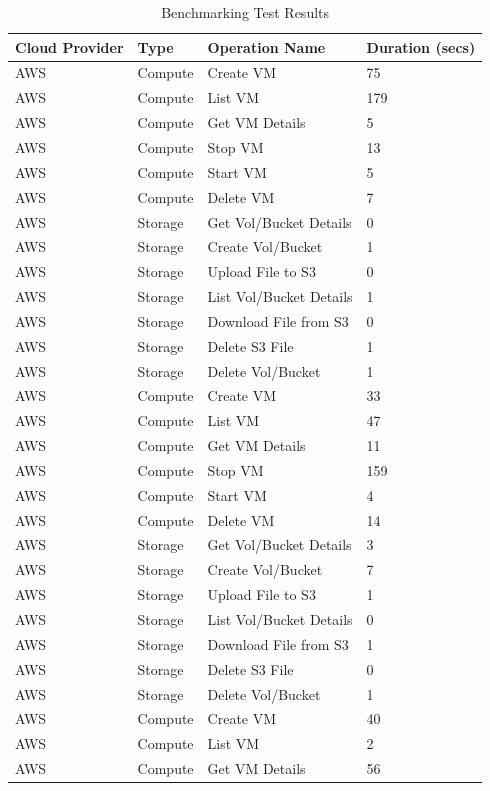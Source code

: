 \begin{table}[htb]
\centering
\caption{Benchmarking Test Results}\label{t:benchmarking}
\begin{tabular} {p{3cm}|p{3cm}|p{5cm}|p{3cm}}
Cloud Provider & Type & Operation Name & Duration (secs) \\
\toprule
AWS & Compute & Create VM & 75 \\
AWS & Compute & List VM & 179 \\
AWS & Compute & Get VM Details & 5 \\
AWS & Compute & Stop VM & 13  \\
AWS & Compute & Start VM & 5  \\
AWS & Compute & Delete VM & 7  \\
AWS & Storage & Get Vol/Bucket Details & 0  \\
AWS & Storage & Create Vol/Bucket & 1  \\
AWS & Storage & Upload File to S3 & 0  \\
AWS & Storage & List Vol/Bucket Details & 1  \\
AWS & Storage & Download File from S3 & 0  \\
AWS & Storage & Delete S3 File & 1  \\
AWS & Storage & Delete Vol/Bucket & 1  \\
AWS & Compute & Create VM & 33  \\
AWS & Compute & List VM & 47  \\
AWS & Compute & Get VM Details & 11  \\
AWS & Compute & Stop VM & 159  \\
AWS & Compute & Start VM & 4  \\
AWS & Compute & Delete VM & 14  \\
AWS & Storage & Get Vol/Bucket Details & 3  \\
AWS & Storage & Create Vol/Bucket & 7  \\
AWS & Storage & Upload File to S3 & 1  \\
AWS & Storage & List Vol/Bucket Details & 0  \\
AWS & Storage & Download File from S3 & 1  \\
AWS & Storage & Delete S3 File & 0  \\
AWS & Storage & Delete Vol/Bucket & 1  \\
AWS & Compute & Create VM & 40  \\
AWS & Compute & List VM & 2  \\
AWS & Compute & Get VM Details & 56  \\

\end{tabular}
\end{table}

